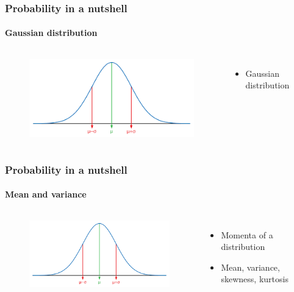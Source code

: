 \documentclass[aspectratio=43]{beamer}
\begin{document}
\begin{frame}

	\frametitle{Probability in a nutshell}
	\framesubtitle{Gaussian distribution}
	
	\footnotesize
	
	\begin{columns}	
	
		
		\begin{figure}
			\includegraphics[width = 6 cm]{plots/part1/gaussian.png}
		\end{figure}
		
		
		\begin{itemize}
			\item Gaussian distribution
		\end{itemize}
		
	\end{columns}

\end{frame}

\begin{frame}
	
	\frametitle{Probability in a nutshell}
	\framesubtitle{Mean and variance}
	
	\footnotesize
	
	\begin{columns}	
		
		\column{0.5\textwidth}
		
		\begin{figure}
			\includegraphics[width = 6 cm]{plots/part1/gaussian.png}
		\end{figure}
		
		\column{0.5\textwidth}
		
		\begin{itemize}
			\item Momenta of a distribution
			\item Mean, variance, skewness, kurtosis
		\end{itemize}
		
	\end{columns}

\end{frame}
\end{document}
